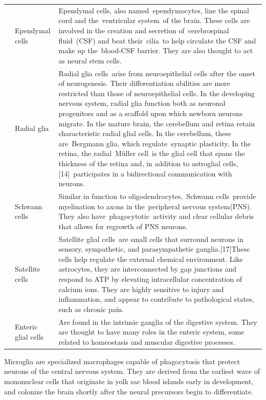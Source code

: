 \documentclass[]{book}
\begin{document}
\begin{longtable}[t]{>{\raggedright\arraybackslash}p{5em}>{\raggedright\arraybackslash}p{10em}>{\raggedright\arraybackslash}p{20em}}
 & Ependymal cells & Ependymal cells, also named ependymocytes, line the spinal cord and the ventricular system of the brain. These cells are involved in the creation and secretion of cerebrospinal fluid (CSF) and beat their cilia to help circulate the CSF and make up the blood-CSF barrier. They are also thought to act as neural stem cells.\\

\rowcolor{gray!6}  \multirow{-7}{5em}{\raggedright\arraybackslash CNS} & Radial glia & Radial glia cells arise from neuroepithelial cells after the onset of neurogenesis. Their differentiation abilities are more restricted than those of neuroepithelial cells. In the developing nervous system, radial glia function both as neuronal progenitors and as a scaffold upon which newborn neurons migrate. In the mature brain, the cerebellum and retina retain characteristic radial glial cells. In the cerebellum, these are Bergmann glia, which regulate synaptic plasticity. In the retina, the radial Müller cell is the glial cell that spans the thickness of the retina and, in addition to astroglial cells,[14] participates in a bidirectional communication with neurons.\\
\cmidrule{1-3}
 & Schwann cells & Similar in function to oligodendrocytes, Schwann cells provide myelination to axons in the peripheral nervous system(PNS). They also have phagocytotic activity and clear cellular debris that allows for regrowth of PNS neurons.\\

\rowcolor{gray!6}   & Satellite cells & Satellite glial cells are small cells that surround neurons in sensory, sympathetic, and parasympathetic ganglia.[17]These cells help regulate the external chemical environment. Like astrocytes, they are interconnected by gap junctions and respond to ATP by elevating intracellular concentration of calcium ions. They are highly sensitive to injury and inflammation, and appear to contribute to pathological states, such as chronic pain.\\

\multirow{-3}{5em}{\raggedright\arraybackslash PNS} & Enteric glial cells & Are found in the intrinsic ganglia of the digestive system. They are thought to have many roles in the enteric system, some related to homeostasis and muscular digestive processes.\\
\bottomrule
\end{longtable}

Microglia are specialized macrophages capable of phagocytosis that protect neurons of the central nervous system. They are derived from the earliest wave of mononuclear cells that originate in yolk sac blood islands early in development, and colonize the brain shortly after the neural precursors begin to differentiate.
\end{document}
